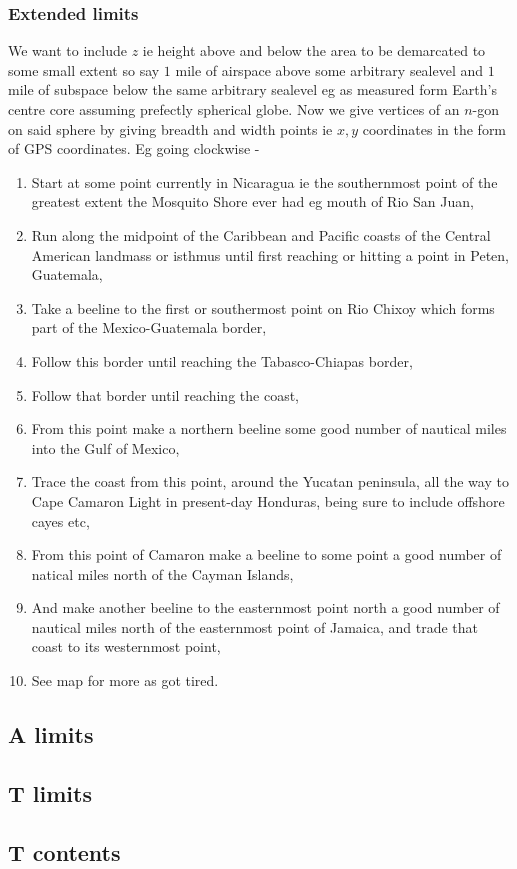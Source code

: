 \documentclass{amsart}
\begin{document}
\subsubsection{Extended limits} We want to include \(z\) ie height above and below the area to be demarcated to some small extent so say \(1\) mile of airspace above some arbitrary sealevel and \(1\) mile of subspace below the same arbitrary sealevel eg as measured form Earth's centre core assuming prefectly spherical globe. Now we give vertices of an \(n\)-gon on said sphere by giving breadth and width points ie \(x,y\) coordinates in the form of GPS coordinates. Eg going clockwise -
	\begin{enumerate}
	\item Start at some point currently in Nicaragua ie the southernmost point of the greatest extent the Mosquito Shore ever had eg mouth of Rio San Juan,
	\item Run along the midpoint of the Caribbean and Pacific coasts of the Central American landmass or isthmus until first reaching or hitting a point in Peten, Guatemala,
	\item Take a beeline to the first or southermost point on Rio Chixoy which forms part of the Mexico-Guatemala border,
	\item Follow this border until reaching the Tabasco-Chiapas border,
	\item Follow that border until reaching the coast,
	\item From this point make a northern beeline some good number of nautical miles into the Gulf of Mexico,
	\item Trace the coast from this point, around the Yucatan peninsula, all the way to Cape Camaron Light in present-day Honduras, being sure to include offshore cayes etc,
	\item From this point of Camaron make a beeline to some point a good number of natical miles north of the Cayman Islands,
	\item And make another beeline to the easternmost point north a good number of nautical miles north of the easternmost point of Jamaica, and trade that coast to its westernmost point,
	\item See map for more as got tired.
	\end{enumerate}
\subsection{A limits}
\subsection{T limits}
\subsection{T contents}
\end{document}
